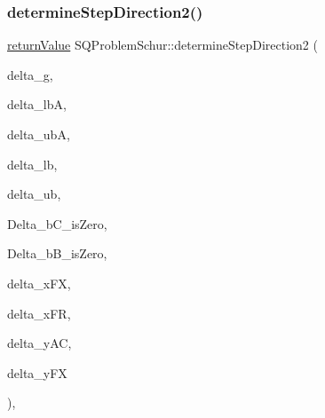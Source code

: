 \subsubsection{\texorpdfstring{determine\+Step\+Direction2()}{determineStepDirection2()}}
{\footnotesize\ttfamily \hyperlink{_message_handling_8hpp_a81d556f613bfbabd0b1f9488c0fa865e}{return\+Value} S\+Q\+Problem\+Schur\+::determine\+Step\+Direction2 (\begin{DoxyParamCaption}\item[{const \hyperlink{qp_o_a_s_e_s__wrapper_8h_a0d00e2b3dfadee81331bbb39068570c4}{real\+\_\+t} $\ast$const}]{delta\+\_\+g,  }\item[{const \hyperlink{qp_o_a_s_e_s__wrapper_8h_a0d00e2b3dfadee81331bbb39068570c4}{real\+\_\+t} $\ast$const}]{delta\+\_\+lbA,  }\item[{const \hyperlink{qp_o_a_s_e_s__wrapper_8h_a0d00e2b3dfadee81331bbb39068570c4}{real\+\_\+t} $\ast$const}]{delta\+\_\+ubA,  }\item[{const \hyperlink{qp_o_a_s_e_s__wrapper_8h_a0d00e2b3dfadee81331bbb39068570c4}{real\+\_\+t} $\ast$const}]{delta\+\_\+lb,  }\item[{const \hyperlink{qp_o_a_s_e_s__wrapper_8h_a0d00e2b3dfadee81331bbb39068570c4}{real\+\_\+t} $\ast$const}]{delta\+\_\+ub,  }\item[{\hyperlink{_types_8hpp_a20f82124c82b6f5686a7fce454ef9089}{Boolean\+Type}}]{Delta\+\_\+b\+C\+\_\+is\+Zero,  }\item[{\hyperlink{_types_8hpp_a20f82124c82b6f5686a7fce454ef9089}{Boolean\+Type}}]{Delta\+\_\+b\+B\+\_\+is\+Zero,  }\item[{\hyperlink{qp_o_a_s_e_s__wrapper_8h_a0d00e2b3dfadee81331bbb39068570c4}{real\+\_\+t} $\ast$const}]{delta\+\_\+x\+FX,  }\item[{\hyperlink{qp_o_a_s_e_s__wrapper_8h_a0d00e2b3dfadee81331bbb39068570c4}{real\+\_\+t} $\ast$const}]{delta\+\_\+x\+FR,  }\item[{\hyperlink{qp_o_a_s_e_s__wrapper_8h_a0d00e2b3dfadee81331bbb39068570c4}{real\+\_\+t} $\ast$const}]{delta\+\_\+y\+AC,  }\item[{\hyperlink{qp_o_a_s_e_s__wrapper_8h_a0d00e2b3dfadee81331bbb39068570c4}{real\+\_\+t} $\ast$const}]{delta\+\_\+y\+FX }\end{DoxyParamCaption})\hspace{0.3cm}{\ttfamily [protected]}, {\ttfamily [virtual]}}


